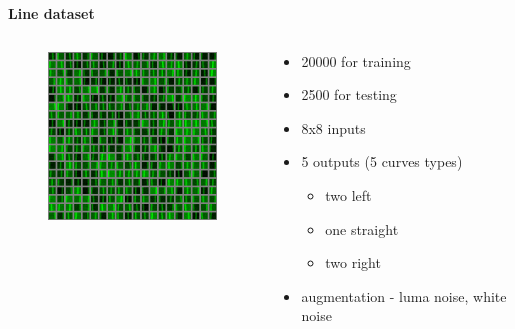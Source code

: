 \documentclass[xcolor=dvipsnames]{beamer}
\begin{document}
\begin{frame}{\bf Line dataset}


\begin{columns}

\begin{column}{0.5\textwidth}

    \begin{figure}
        \includegraphics[scale=0.9]{../../pictures/line_follower_dataset.png}
    \end{figure}

\end{column}



\begin{column}{0.5\textwidth}  %
{\small
    \begin{itemize}
        \item 20000 for training
        \item 2500 for testing
        \item 8x8 inputs
        \item 5 outputs (5 curves types)
            \begin{itemize}
                \item two left
                \item one straight
                \item two right
            \end{itemize}
        \item augmentation - luma noise, white noise

    \end{itemize}
}
\end{column}

\end{columns}



\end{frame}
\end{document}
